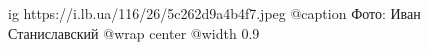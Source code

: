  
 
 
 
 

\ifcmt
  ig https://i.lb.ua/116/26/5c262d9a4b4f7.jpeg
	@caption Фото: Иван Станиславский
  @wrap center
  @width 0.9
\fi
